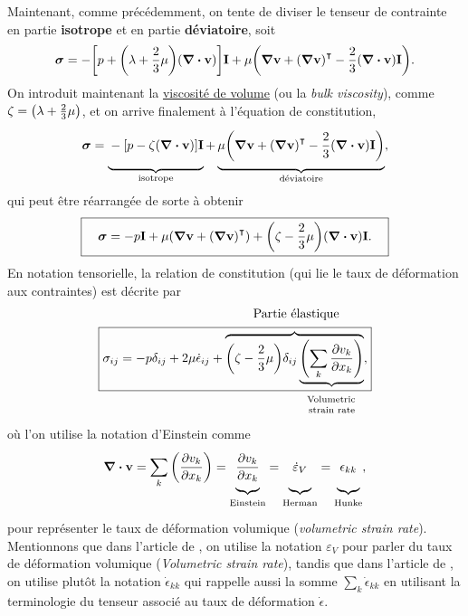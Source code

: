 \documentclass[10pt]{article}
\numberwithin{equation}{section}
\newcommand{\vv}{\vb{v}}
\newcommand{\tall}{\vphantom{pA^{x^x}_p}}
\newcommand{\venti}{\vphantom{\sum_x^x}}
\newcommand{\pt}{\hspace{1pt}} %
\begin{document}
Maintenant, comme précédemment, on tente de diviser le tenseur de contrainte en partie \textbf{isotrope} et en partie \textbf{déviatoire}, soit
\begin{equation}
   \boldsymbol{\sigma} = -\qty[p + \qty(\lambda + \frac{2}{3}\mu)\qty(\divergence{\vv})]\mathbf{I} + \mu\qty(\gradient{\vv} + \qty(\gradient{\vv})^\intercal - \frac{2}{3}\qty(\divergence{\vv})\mathbf{I}).
\end{equation}
On introduit maintenant la \href{https://en.wikipedia.org/wiki/Volume\_viscosity}{viscosité de volume} (ou la \emph{bulk viscosity}), comme \(\zeta = \qty(\lambda + \frac{2}{3}\mu)\), et on arrive finalement à l'équation de constitution,
\begin{equation}
   \boldsymbol{\sigma} = \underbrace{\venti-\qty[p - \zeta\qty(\divergence{\vv})]\mathbf{I}}_\text{isotrope}
   +\underbrace{\venti\mu\qty(\gradient{\vv} + \qty(\gradient{\vv})^\intercal - \frac{2}{3}\qty(\divergence{\vv})\mathbf{I})}_\text{déviatoire},
\end{equation}
qui peut être réarrangée de sorte à obtenir
\begin{equation}
   \boxed{\quad\boldsymbol{\sigma} = -p\mathbf{I} + \mu\qty(\gradient{\vv} + \qty(\gradient{\vv})^\intercal) + \qty(\zeta - \frac{2}{3}\mu)\qty(\divergence{\vv})\mathbf{I}.\quad}
\end{equation}
En notation tensorielle, la relation de constitution (qui lie le taux de déformation aux contraintes) est décrite par
\begin{align}
\label{eq:org24a1681}
   & \hspace{4.3cm}\text{Partie élastique}\nonumber\\
   &\boxed{\sigma_{ij} = -p\delta_{ij} + 2\mu\dot{\epsilon}_{ij} + \overbrace{\qty(\zeta-\frac{2}{3}\mu) \delta_{ij}\underbrace{\qty(\sum_k\pdv{v_k}{x_k})}},}\\
   & \hspace{5.8cm}\substack{\text{Volumetric}\\ \tall\pt\text{strain rate}}\nonumber
\end{align}
où l'on utilise la notation d'Einstein comme
\begin{equation}
   \divergence{\vv} = \sum_k \qty(\pdv{v_k}{x_k}) =
   \underbrace{\pdv{v_k}{x_k}\venti}_{\tall\text{Einstein}} =
   \underbrace{\venti\dot{\varepsilon}_V}_{\tall\text{Herman}} =
   \underbrace{\venti\epsilon_{kk}}_{\tall\text{Hunke}},
\end{equation}
pour représenter le taux de déformation volumique (\emph{volumetric strain rate}).
Mentionnons que dans l'article de \Textcite{herman2022granular}, on utilise la notation \(\varepsilon_V\) pour parler du taux de déformation volumique (\emph{Volumetric strain rate}), tandis que dans l'article de \Textcite{hunke1997elastic}, on utilise plutôt la notation \(\dot{\epsilon}_{kk}\) qui rappelle aussi la somme \(\sum_k \dot{\epsilon}_{kk}\) en utilisant la terminologie du tenseur associé au taux de déformation \(\dot{\epsilon}\).\bigskip
\end{document}
